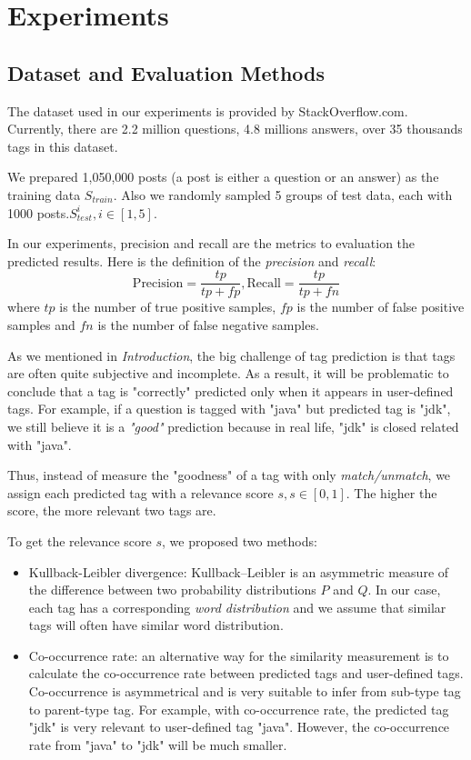 \section{Experiments}

\subsection{Dataset and Evaluation Methods}
The dataset used in our experiments is provided by StackOverflow.com. Currently, there are 2.2 million questions, 4.8 millions answers, over 35 thousands tags in this dataset\cite{DataDump}.

We prepared 1,050,000 posts (a post is either a question or an answer)  as the training data $S_{train}$. Also we randomly sampled 5 groups of test data, each with 1000 posts.$S_{test}^i, i \in [1, 5]$.

In our experiments, precision and recall are the metrics to evaluation the predicted results. Here is the definition of the \emph{precision} and \emph{recall}:
$$ \text{Precision}=\frac{tp}{tp+fp}, \text{Recall}=\frac{tp}{tp+fn} $$
where $tp$ is the number of true positive samples, $fp$ is the number of false positive samples and $fn$ is the number of false negative samples.

As we mentioned in \emph{Introduction}, the big challenge of tag prediction is that tags are often quite subjective and incomplete. As a result, it will be problematic to conclude that a tag is "correctly" predicted only when it appears in user-defined tags. For example, if a question is tagged with "java" but predicted tag is "jdk", we still believe it is a \emph{"good"} prediction because in real life, "jdk" is closed related with "java".

Thus, instead of measure the "goodness" of a tag with only \emph{match/unmatch}, we assign each predicted tag with a relevance score $s, s \in [0, 1]$. The higher the score, the more
relevant two tags are.

To get the relevance score $s$, we proposed two methods:
\begin{itemize}
    \item{Kullback-Leibler divergence}: Kullback–Leibler is an asymmetric measure of the difference between two probability distributions $P$ and $Q$. In our case, each tag has a corresponding \emph{word distribution} and we assume that similar tags will often have similar word distribution.
    \item{Co-occurrence rate}: an alternative way for the similarity measurement is to calculate the co-occurrence rate between predicted tags and user-defined tags. Co-occurrence is asymmetrical and is very suitable to infer from sub-type tag to parent-type tag. For example, with co-occurrence rate, the predicted tag "jdk" is very relevant to user-defined tag "java". However, the co-occurrence rate from "java" to "jdk" will be much smaller.
\end{itemize}

